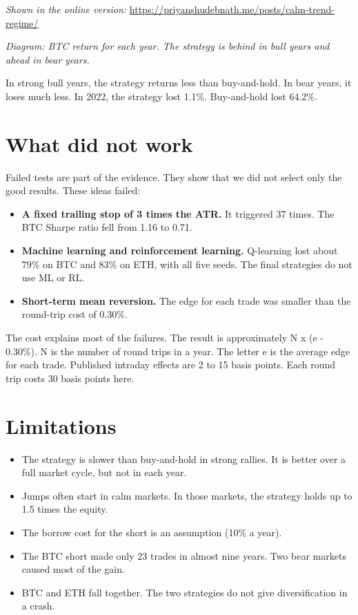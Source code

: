 \documentclass[11pt,a4paper]{article}
\begin{document}
\noindent\textit{Shown in the online version:} \url{https://priyanshudebnath.me/posts/calm-trend-regime/}\par\textit{Diagram: BTC return for each year. The strategy is behind in bull years and ahead in bear years.}

In strong bull years, the strategy returns less than buy-and-hold. In bear years, it loses much less. In 2022, the strategy lost 1.1\%. Buy-and-hold lost 64.2\%.

\section{What did not work}

Failed tests are part of the evidence. They show that we did not select only the good results. These ideas failed:

\begin{itemize}
\item \textbf{A fixed trailing stop of 3 times the ATR.} It triggered 37 times. The BTC Sharpe ratio fell from 1.16 to 0.71.
\item \textbf{Machine learning and reinforcement learning.} Q-learning lost about 79\% on BTC and 83\% on ETH, with all five seeds. The final strategies do not use ML or RL.
\item \textbf{Short-term mean reversion.} The edge for each trade was smaller than the round-trip cost of 0.30\%.
\end{itemize}

The cost explains most of the failures. The result is approximately N x (e - 0.30\%). N is the number of round trips in a year. The letter e is the average edge for each trade. Published intraday effects are 2 to 15 basis points. Each round trip costs 30 basis points here.

\section{Limitations}

\begin{itemize}
\item The strategy is slower than buy-and-hold in strong rallies. It is better over a full market cycle, but not in each year.
\item Jumps often start in calm markets. In those markets, the strategy holds up to 1.5 times the equity.
\item The borrow cost for the short is an assumption (10\% a year).
\item The BTC short made only 23 trades in almost nine years. Two bear markets caused most of the gain.
\item BTC and ETH fall together. The two strategies do not give diversification in a crash.
\end{itemize}
\end{document}
